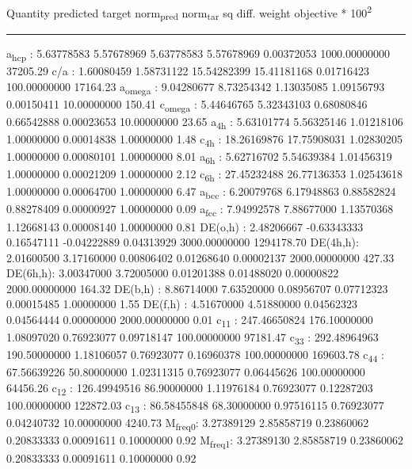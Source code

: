 \documentclass[11pt]{article}
\begin{document}
Quantity      predicted    target     norm\textsubscript{pred}   norm\textsubscript{tar}    sq diff.      weight    objective * 100\textsuperscript{2} 

\noindent\rule{\textwidth}{0.5pt}
a\textsubscript{hcp}   :   5.63778583   5.57678969   5.63778583   5.57678969   0.00372053 1000.00000000     37205.29
c/a     :   1.60080459   1.58731122  15.54282399  15.41181168   0.01716423 100.00000000     17164.23
a\textsubscript{omega} :   9.04280677   8.73254342   1.13035085   1.09156793   0.00150411  10.00000000       150.41
c\textsubscript{omega} :   5.44646765   5.32343103   0.68080846   0.66542888   0.00023653  10.00000000        23.65
a\textsubscript{4h}    :   5.63101774   5.56325146   1.01218106   1.00000000   0.00014838   1.00000000         1.48
c\textsubscript{4h}    :  18.26169876  17.75908031   1.02830205   1.00000000   0.00080101   1.00000000         8.01
a\textsubscript{6h}    :   5.62716702   5.54639384   1.01456319   1.00000000   0.00021209   1.00000000         2.12
c\textsubscript{6h}    :  27.45232488  26.77136353   1.02543618   1.00000000   0.00064700   1.00000000         6.47
a\textsubscript{bcc}   :   6.20079768   6.17948863   0.88582824   0.88278409   0.00000927   1.00000000         0.09
a\textsubscript{fcc}   :   7.94992578   7.88677000   1.13570368   1.12668143   0.00008140   1.00000000         0.81
DE(o,h) :   2.48206667  -0.63343333   0.16547111  -0.04222889   0.04313929 3000.00000000   1294178.70
DE(4h,h):   2.01600500   3.17160000   0.00806402   0.01268640   0.00002137 2000.00000000       427.33
DE(6h,h):   3.00347000   3.72005000   0.01201388   0.01488020   0.00000822 2000.00000000       164.32
DE(b,h) :   8.86714000   7.63520000   0.08956707   0.07712323   0.00015485   1.00000000         1.55
DE(f,h) :   4.51670000   4.51880000   0.04562323   0.04564444   0.00000000 2000.00000000         0.01
c\textsubscript{11}    : 247.46650824 176.10000000   1.08097020   0.76923077   0.09718147 100.00000000     97181.47
c\textsubscript{33}    : 292.48964963 190.50000000   1.18106057   0.76923077   0.16960378 100.00000000    169603.78
c\textsubscript{44}    :  67.56639226  50.80000000   1.02311315   0.76923077   0.06445626 100.00000000     64456.26
c\textsubscript{12}    : 126.49949516  86.90000000   1.11976184   0.76923077   0.12287203 100.00000000    122872.03
c\textsubscript{13}    :  86.58455848  68.30000000   0.97516115   0.76923077   0.04240732  10.00000000      4240.73
M\textsubscript{freq}\textsubscript{0}:   3.27389129   2.85858719   0.23860062   0.20833333   0.00091611   0.10000000         0.92
M\textsubscript{freq}\textsubscript{1}:   3.27389130   2.85858719   0.23860062   0.20833333   0.00091611   0.10000000         0.92
\end{document}
